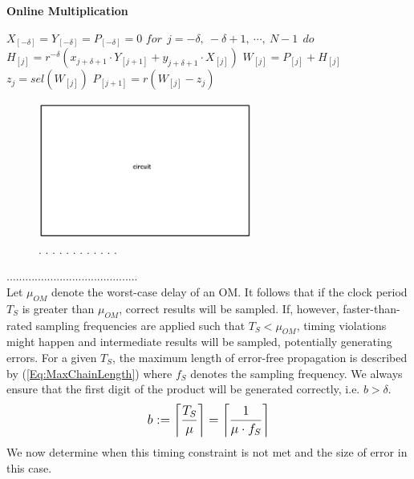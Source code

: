 \documentclass[journal]{IEEEtran}
\begin{document}
\vspace{0.5cm}

\begin{algorithm}{\bf Online Multiplication} \label{Algorithm:OnlineMult}
  \begin{algorithmic}[1]
    $X_{[-\delta]}=Y_{[-\delta]}=P_{[-\delta]}=0$
     $for~~ j=-\delta,~-\delta+1,~\cdots,~N-1 ~~do$
     \label{Eq:OnlineMult_General}
\State  $    H_{[j]}  = r^{-\delta}\left(x_{j+\delta+1}\cdot Y_{[j+1]}+y_{j+\delta+1}\cdot X_{[j]}\right)$\label{Eq:OnlineMult_H}
      \State   $  W_{[j]}    = P_{[j]} + H_{[j]}$
     \State    $  z_j        =  sel(W_{[j]})$
    \State     $  P_{[j+1]}  =  r\left(W_{[j]}-z_j\right)$\label{Eq:OnlineMult_P}
  \end{algorithmic}
\end{algorithm}




\begin{figure}[h!]
\begin{center}
\includegraphics[width=7cm,height=4.5cm]{./Figures/circuit}
\caption{  . . . . . . . . . . . . }\label{circuit}
\end{center}
\end{figure}




..........................................\\

Let $\mu_{OM}$ denote the worst-case delay of an OM. It follows that if the clock period $T_S$ is greater than $\mu_{OM}$, correct results will be sampled. If, however, faster-than-rated sampling frequencies are applied such that $T_S<\mu_{OM}$, timing violations might happen and intermediate results will be sampled, potentially generating errors. For a given $T_S$, the maximum length of error-free propagation is described by (\ref{Eq:MaxChainLength}) where $f_S$ denotes the sampling frequency. We always ensure that the first digit of the product will be generated correctly, i.e. $b>\delta$.
%
\begin{eqnarray}\label{Eq:MaxChainLength}
\footnotesize
  b:=\left\lceil \frac{T_S}{\mu} \right\rceil=\left\lceil \frac{1}{\mu\cdot f_S}\right\rceil
\normalsize
\end{eqnarray}
%
We now determine when this timing constraint is not met and the size of error in this case.\\
\end{document}
